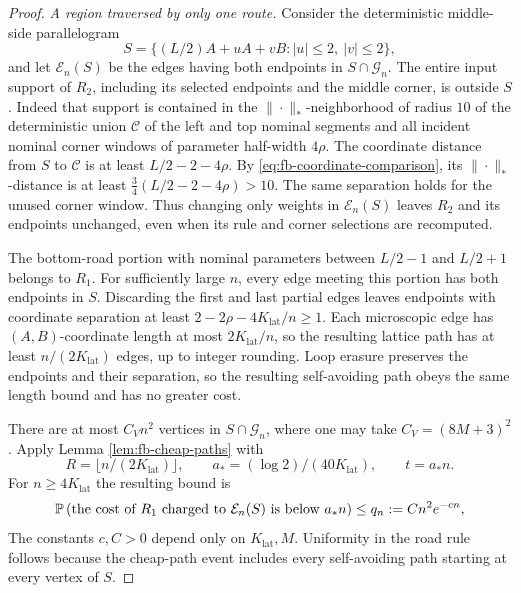 \begin{proof}
\emph{A region traversed by only one route.}
Consider the deterministic middle-side parallelogram
\[
 S=\{(L/2)A+uA+vB:|u|\le2,\ |v|\le2\},
\]
and let $\mathcal E_n(S)$ be the edges having both endpoints in
$S\cap\mathcal G_n$.  The entire input support of $R_2$, including
its selected endpoints and the middle corner, is outside $S$.
Indeed that support is contained in the $\|\cdot\|_*$-neighborhood of radius $10$
of the deterministic union $\mathcal C$ of the left and top nominal
segments and all incident nominal corner windows of parameter
half-width $4\rho$.  The coordinate distance from $S$ to $\mathcal C$ is at least
$L/2-2-4\rho$.  By \eqref{eq:fb-coordinate-comparison}, its
$\|\cdot\|_*$-distance is at least
$\tfrac34(L/2-2-4\rho)>10$.  The same separation holds for the unused corner window.
Thus changing only weights in $\mathcal E_n(S)$
leaves $R_2$ and its endpoints unchanged, even when its rule and
corner selections are recomputed.

The bottom-road portion with nominal parameters between
$L/2-1$ and $L/2+1$ belongs to $R_1$.  For sufficiently large $n$,
every edge meeting this portion has both endpoints in $S$.  Discarding
the first and last partial edges leaves endpoints with coordinate
separation at least
$2-2\rho-4K_{\mathrm{lat}}/n\ge1$.  Each microscopic edge has
$(A,B)$-coordinate length at most $2K_{\mathrm{lat}}/n$, so the resulting
lattice path has at least $n/(2K_{\mathrm{lat}})$ edges, up to integer
rounding.  Loop erasure preserves the endpoints and their separation,
so the resulting self-avoiding path obeys the same length bound and
has no greater cost.

There are at most $C_V n^2$ vertices in $S\cap\mathcal G_n$, where
one may take $C_V=(8M+3)^2$.  Apply Lemma
\ref{lem:fb-cheap-paths} with
\[
 R=\lfloor n/(2K_{\mathrm{lat}})\rfloor,\qquad
 a_*=(\log2)/(40K_{\mathrm{lat}}),\qquad t=a_*n.
\]
For $n\ge4K_{\mathrm{lat}}$ the resulting bound is
\begin{equation}
 \mathbb P \left(
 \text{the cost of $R_1$ charged to $\mathcal E_n(S)$ is below $a_*n$}
 \right)
 \le q_n:=C n^2e^{-cn},
 \label{eq:fb-middle-saving}
\end{equation}
The constants $c,C>0$ depend only on $K_{\mathrm{lat}},M$.  Uniformity
in the road rule follows because the cheap-path event includes every
self-avoiding path starting at every vertex of $S$.


\end{proof}
